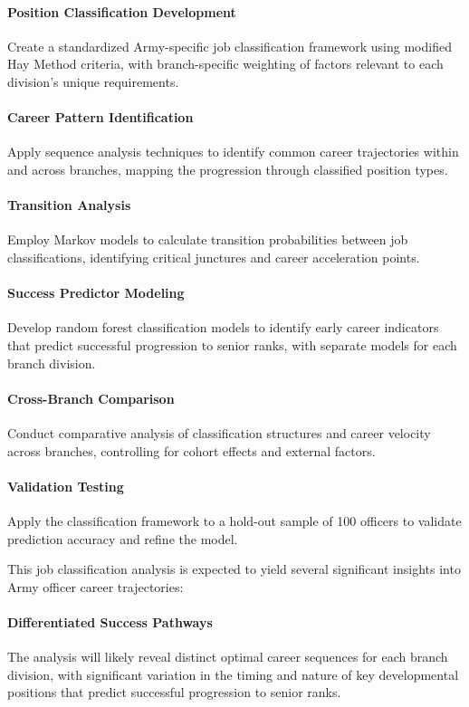 \documentclass[../main.tex]{subfiles}
\begin{document}
\paragraph{Position Classification Development} Create a standardized Army-specific job classification framework using modified Hay Method criteria, with branch-specific weighting of factors relevant to each division's unique requirements.

\paragraph{Career Pattern Identification} Apply sequence analysis techniques to identify common career trajectories within and across branches, mapping the progression through classified position types.

\paragraph{Transition Analysis} Employ Markov models to calculate transition probabilities between job classifications, identifying critical junctures and career acceleration points.

\paragraph{Success Predictor Modeling} Develop random forest classification models to identify early career indicators that predict successful progression to senior ranks, with separate models for each branch division.

\paragraph{Cross-Branch Comparison} Conduct comparative analysis of classification structures and career velocity across branches, controlling for cohort effects and external factors.

\paragraph{Validation Testing} Apply the classification framework to a hold-out sample of 100 officers to validate prediction accuracy and refine the model.

This job classification analysis is expected to yield several significant insights into Army officer career trajectories:

\paragraph{Differentiated Success Pathways} The analysis will likely reveal distinct optimal career sequences for each branch division, with significant variation in the timing and nature of key developmental positions that predict successful progression to senior ranks.
\end{document}
